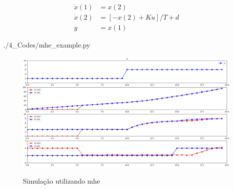 \begin{subequations}
	\label{eq:motor_dynamics_ss}
	\begin{align}
		\dot{x}(1) &= x(2) 					\\
		\dot{x}(2) &= [-x(2) + Ku] / T + d	\\
		y &= x(1)
	\end{align}
\end{subequations}


	{./4_Codes/mhe_example.py}
	\begin{center}
	\end{center}
	
\begin{figure}[h]
	\caption{Simulação utilizando \acrlong{mhe}}
	\begin{center}
		\includegraphics[width=1\textwidth]{./5_images/fig_mhe_example.png} 
		\label{fig:mhe_example}
	\end{center}
	\centering
\end{figure}
